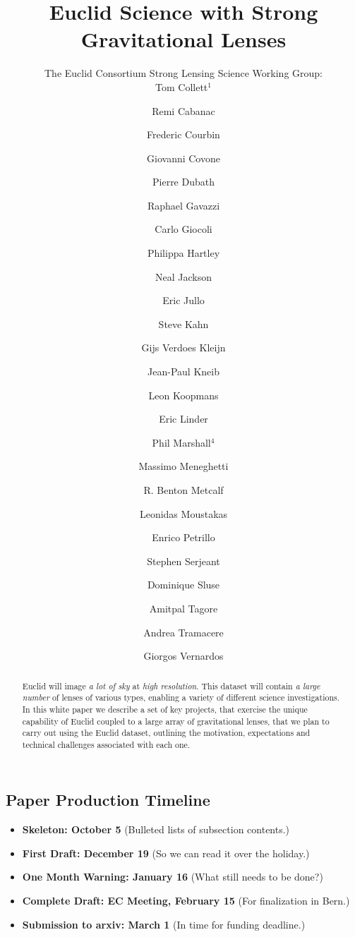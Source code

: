 \documentclass[twocolumn]{svjour3}
\begin{document}
\title{Euclid Science with Strong Gravitational Lenses}

\author{The Euclid Consortium Strong Lensing Science Working Group:\\
Tom Collett$^1$ \and
Remi Cabanac \and
Frederic Courbin \and
Giovanni Covone \and
Pierre Dubath \and
Raphael Gavazzi \and
Carlo Giocoli \and
Philippa Hartley \and
Neal Jackson \and
Eric Jullo \and
Steve Kahn \and
Gijs Verdoes Kleijn \and
Jean-Paul Kneib \and
Leon Koopmans \and
Eric Linder \and
Phil Marshall$^4$ \and
Massimo Meneghetti \and
R. Benton Metcalf \and
Leonidas Moustakas \and
Enrico Petrillo \and
Stephen Serjeant \and
Dominique Sluse \and
Amitpal Tagore \and
Andrea Tramacere \and
Giorgos Vernardos
}



\maketitle


\begin{abstract}
\noindent Euclid will image \emph{a lot of sky} at \emph{high
resolution}. This dataset will contain {\it a large number} of lenses of
various types, enabling a variety  of different  science investigations.
In this white paper we describe a set of key projects, that exercise the
unique capability of Euclid coupled to a large array of gravitational
lenses, that we plan to carry out using the Euclid dataset, outlining
the motivation, expectations and technical challenges associated with
each one.
\end{abstract}


\subsection*{Paper Production Timeline}
\begin{itemize}
    \item {\bf Skeleton: October 5} (Bulleted lists of subsection contents.)
    \item {\bf First Draft: December 19} (So we can read it over the holiday.)
    \item {\bf One Month Warning: January 16} (What still needs to be done?)
    \item {\bf Complete Draft: EC Meeting, February 15} (For finalization in Bern.)
    \item {\bf Submission to arxiv: March 1} (In time for funding deadline.)
\end{itemize}
\end{document}
